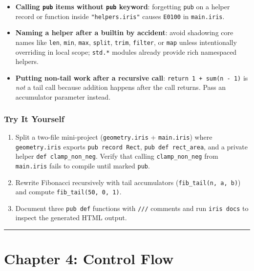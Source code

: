 \documentclass[
  english,
  oneside]{book}
\providecommand{\tightlist}{%
  \setlength{\itemsep}{0pt}\setlength{\parskip}{0pt}}
\begin{document}
\begin{itemize}
\tightlist
\item
  \textbf{Calling \texttt{pub} items without \texttt{pub} keyword}:
  forgetting \texttt{pub} on a helper record or function inside
  \texttt{"helpers.iris"} causes \texttt{E0100} in \texttt{main.iris}.
\item
  \textbf{Naming a helper after a builtin by accident}: avoid shadowing
  core names like \texttt{len}, \texttt{min}, \texttt{max},
  \texttt{split}, \texttt{trim}, \texttt{filter}, or \texttt{map} unless
  intentionally overriding in local scope; \texttt{std.*} modules
  already provide rich namespaced helpers.
\item
  \textbf{Putting non-tail work after a recursive call}:
  \texttt{return\ 1\ +\ sum(n\ -\ 1)} is \emph{not} a tail call because
  addition happens after the call returns. Pass an accumulator parameter
  instead.
\end{itemize}

\subsection{Try It Yourself}\label{try-it-yourself-2}

\begin{enumerate}
\def\labelenumi{\arabic{enumi}.}
\tightlist
\item
  Split a two-file mini-project (\texttt{geometry.iris} +
  \texttt{main.iris}) where \texttt{geometry.iris} exports
  \texttt{pub\ record\ Rect}, \texttt{pub\ def\ rect\_area}, and a
  private helper \texttt{def\ clamp\_non\_neg}. Verify that calling
  \texttt{clamp\_non\_neg} from \texttt{main.iris} fails to compile
  until marked \texttt{pub}.
\item
  Rewrite Fibonacci recursively with tail accumulators
  (\texttt{fib\_tail(n,\ a,\ b)}) and compute
  \texttt{fib\_tail(50,\ 0,\ 1)}.
\item
  Document three \texttt{pub\ def} functions with \texttt{///} comments
  and run \texttt{iris\ docs} to inspect the generated HTML output.
\end{enumerate}

\begin{center}\rule{0.5\linewidth}{0.5pt}\end{center}

\chapter{Chapter 4: Control Flow}\label{chapter-4-control-flow}
\end{document}
